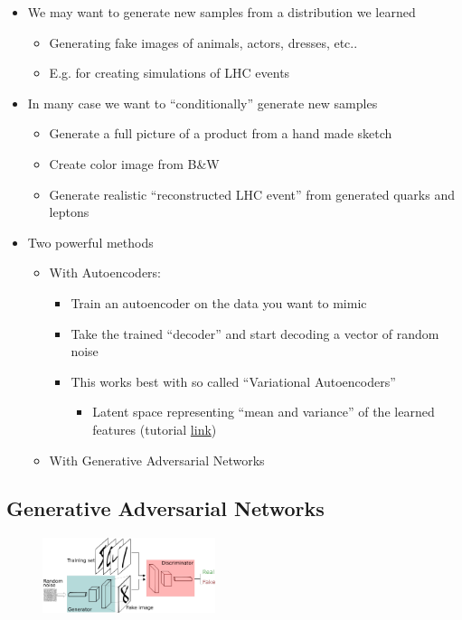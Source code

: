 \begin{itemize}
	\item We may want to generate new samples from a distribution we learned
	\begin{itemize}
		\item Generating fake images of animals, actors, dresses, etc..
		\item E.g. for creating simulations of LHC events
	\end{itemize}
	\item In many case we want to “conditionally” generate new samples
	\begin{itemize}
		\item Generate a full picture of a product from a hand made sketch
		\item Create color image from B\&W 
		\item Generate realistic “reconstructed LHC event” from generated quarks and leptons
	\end{itemize}
	\item Two powerful methods
	\begin{itemize}
		\item With Autoencoders:
		\begin{itemize}
			\item Train an autoencoder on the data you want to mimic
			\item Take the trained “decoder” and start decoding a vector of random noise
			\item This works best with so called “Variational Autoencoders”
			\begin{itemize}
				\item Latent space representing “mean and variance” of the learned	features (tutorial \href{https://towardsdatascience.com/variational-autoencoders-as-generative-models-with-keras-e0c79415a7eb}{link})
			\end{itemize}
		\end{itemize}
		\item With Generative Adversarial Networks
	\end{itemize}
\end{itemize}

\subsection{Generative Adversarial Networks}

\begin{figure}
	\includegraphics[width=0.45\textwidth]{figure_ml/gan.png}
\end{figure}

